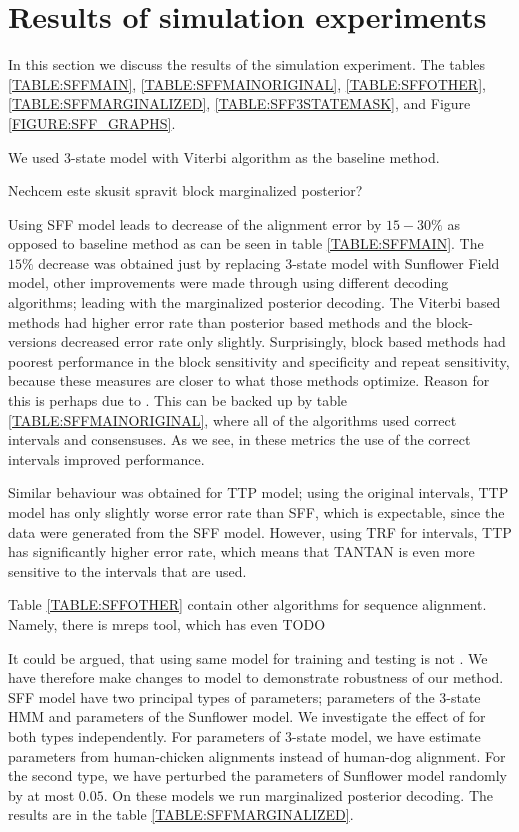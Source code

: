 \section{Results of simulation experiments}

\begin{reformulate*}
In this section we discuss the results of the simulation experiment. The tables
\ref{TABLE:SFFMAIN}, \ref{TABLE:SFFMAINORIGINAL},
\ref{TABLE:SFFOTHER},\ref{TABLE:SFFMARGINALIZED}, \ref{TABLE:SFF3STATEMASK},
and Figure \ref{FIGURE:SFF_GRAPHS}. 

We used 3-state model with Viterbi algorithm as the baseline method.

Nechcem este skusit spravit block marginalized posterior?
\end{reformulate*}



Using SFF model leads to decrease of the alignment error by $15-30\%$ as
opposed to baseline method as can be seen in table \ref{TABLE:SFFMAIN}. The
$15\%$ decrease was obtained just by replacing 3-state model with Sunflower
Field model, other improvements were made through using different decoding
algorithms; leading with the marginalized posterior decoding. The Viterbi based
methods had higher error rate than posterior based methods and the
block-versions decreased error rate only slightly. Surprisingly, block based
methods had poorest performance in the block sensitivity and specificity and
repeat sensitivity, because these measures are closer to what those methods
optimize. Reason for this is perhaps due to . This can be backed up by table \ref{TABLE:SFFMAINORIGINAL}, where
all of the algorithms used correct intervals and consensuses. As we see, in
these metrics the use of the correct intervals improved performance.

Similar behaviour was obtained for TTP model; using the original intervals, TTP
model has only slightly worse error rate than SFF, which is expectable, since
the data were generated from the SFF model. However, using TRF for intervals,
TTP has significantly higher error rate, which means that TANTAN is even more
sensitive to the intervals that are used. 

Table \ref{TABLE:SFFOTHER} contain other algorithms for sequence alignment. Namely, 
there is mreps tool\cite{}, which has even  TODO

It could be argued, that using same model for training and testing is not
. We have therefore make changes to model to demonstrate
robustness of our method. SFF model have two principal types of parameters;
parameters of the 3-state HMM and parameters of the Sunflower model. We
investigate the effect of  for both types
independently. For parameters of 3-state model, we have estimate parameters
from human-chicken alignments instead of human-dog alignment. For the second
type, we have perturbed the parameters of Sunflower model randomly by at most
$0.05$. On these models we run marginalized posterior decoding. The results are
in the table \ref{TABLE:SFFMARGINALIZED}.

